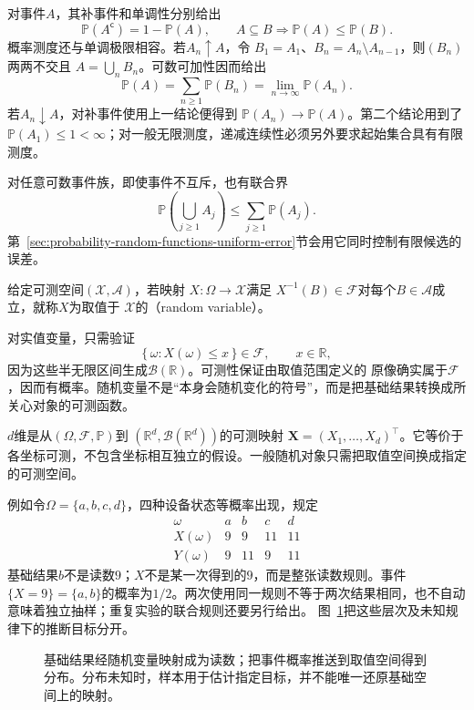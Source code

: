 对事件\(A\)，其补事件和单调性分别给出
\[ \mathbb{P}(A^{\mathsf c})=1-\mathbb{P}(A),
  \qquad A\subseteq B\Longrightarrow\mathbb{P}(A)\leq\mathbb{P}(B). \]
概率测度还与单调极限相容。若\(A_n\uparrow A\)，令
\(B_1=A_1\)、\(B_n=A_n\setminus A_{n-1}\)，则\((B_n)\)两两不交且
\(A=\bigcup_nB_n\)。可数可加性因而给出
\[
  \mathbb{P}(A)
  =\sum_{n\geq1}\mathbb{P}(B_n)
  =\lim_{n\to\infty}\mathbb{P}(A_n).
\]
若\(A_n\downarrow A\)，对补事件使用上一结论便得到
\(\mathbb{P}(A_n)\to\mathbb{P}(A)\)。第二个结论用到了
\(\mathbb{P}(A_1)\leq1<\infty\)；对一般无限测度，递减连续性必须另外要求起始集合具有有限测度。

对任意可数事件族，即使事件不互斥，也有联合界
\begin{equation}
  \mathbb{P}\left(\bigcup_{j\geq1}A_j\right)
  \leq
  \sum_{j\geq1}\mathbb{P}(A_j).
  \label{eq:probability-union-bound}
\end{equation}
第~\ref{sec:probability-random-functions-uniform-error}节会用它同时控制有限候选的误差。
\begin{definition}[随机变量]
  \label{def:probability-random-variable}
给定可测空间\((\mathcal{X},\mathcal{A})\)，若映射
\(X:\Omega\to\mathcal{X}\)满足
\(X^{-1}(B)\in\mathcal{F}\)对每个\(B\in\mathcal{A}\)成立，就称\(X\)为取值于
\(\mathcal{X}\)的（random variable）。
\end{definition}
对实值变量，只需验证
\[ \{\,\omega:X(\omega)\leq x\,\}\in\mathcal{F},
  \qquad x\in\mathbb{R}, \]
因为这些半无限区间生成\(\mathcal{B}(\mathbb{R})\)。可测性保证由取值范围定义的
原像确实属于\(\mathcal{F}\)，因而有概率。随机变量不是“本身会随机变化的符号”，而是把基础结果转换成所关心对象的可测函数。

\begin{definition}[随机向量]
\label{def:rv-random-vector}
\(d\)维是从\((\Omega,\mathcal F,\mathbb P)\)到
\((\mathbb R^d,\mathcal B(\mathbb R^d))\)的可测映射
\(\bm X=(X_1,\ldots,X_d)^\top\)。它等价于各坐标可测，不包含坐标相互独立的假设。一般随机对象只需把取值空间换成指定的可测空间。
\end{definition}

例如令\(\Omega=\{a,b,c,d\}\)，四种设备状态等概率出现，规定
\[
\begin{array}{c|rrrr}
\omega&a&b&c&d\\ \hline
X(\omega)&9&9&11&11\\
Y(\omega)&9&11&9&11
\end{array}
\]
基础结果\(b\)不是读数\(9\)；\(X\)不是某一次得到的\(9\)，而是整张读数规则。事件
\(\{X=9\}=\{a,b\}\)的概率为\(1/2\)。两次使用同一规则不等于两次结果相同，也不自动意味着独立抽样；重复实验的联合规则还要另行给出。
图~\ref{fig:rv-objects}把这些层次及未知规律下的推断目标分开。
\begin{figure}[htbp]
\centering

\caption{基础结果经随机变量映射成为读数；把事件概率推送到取值空间得到分布。分布未知时，样本用于估计指定目标，并不能唯一还原基础空间上的映射。}
\label{fig:rv-objects}
\end{figure}

